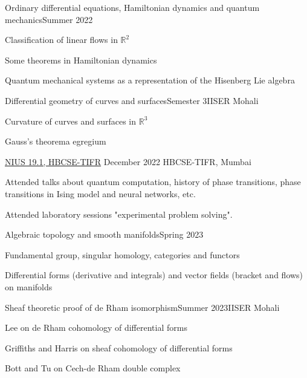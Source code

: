 \documentclass{LoLaTeXcv}
\begin{document}


\begin{lltxJob}{Ordinary differential equations, Hamiltonian dynamics and quantum mechanics}{Summer 2022}{}
	\item Classification of linear flows in $\mathbb{R}^2$
	\item Some theorems in Hamiltonian dynamics
	\item Quantum mechanical systems as a representation of the Hisenberg Lie algebra
\end{lltxJob}

\begin{lltxJob}{Differential geometry of curves and surfaces}{Semester 3}{IISER Mohali}
	\item Curvature of curves and surfaces in $\mathbb{R}^3$
	\item Gauss's theorema egregium
\end{lltxJob}

\begin{lltxJob}{
		\href{https://rupadarshiray.github.io/academicmatters/NIUS-19.1/NIUS-19.1-36-Rupadarshi-Ray-certificate.pdf}{NIUS 19.1, HBCSE-TIFR}}{
		December 2022}{
		HBCSE-TIFR, Mumbai}
	\item Attended talks about quantum computation, history of phase transitions, phase transitions in Ising model and neural networks, etc.
	\item Attended laboratory sessions "experimental problem solving".
\end{lltxJob}

\begin{lltxJob}{Algebraic topology and smooth manifolds}{Spring 2023}{}
	\item Fundamental group, singular homology, categories and functors
	\item Differential forms (derivative and integrals) and vector fields (bracket and flows) on manifolds
\end{lltxJob}

\begin{lltxJob}{Sheaf theoretic proof of de Rham isomorphism}{Summer 2023}{IISER Mohali}
	\item Lee on de Rham cohomology of differential forms
	\item Griffiths and Harris on sheaf cohomology of differential forms
	\item Bott and Tu on Cech-de Rham double complex
\end{lltxJob}
\end{document}
